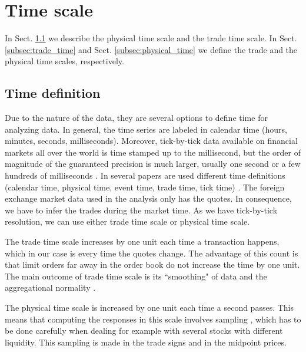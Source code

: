 \section{Time scale}\label{sec:time_scale}

In Sect. \ref{subsec:time_definition} we describe the physical time scale and
the trade time scale. In Sect. \ref{subsec:trade_time} and Sect.
\ref{subsec:physical_time} we define the trade and the physical time scales,
respectively.

\subsection{Time definition}\label{subsec:time_definition}

Due to the nature of the data, they are several options to define time for
analyzing data. In general, the time series are labeled in calendar time
(hours, minutes, seconds, milliseconds). Moreover, tick-by-tick data available
on financial markets all over the world is time stamped up to the millisecond,
but the order of magnitude of the guaranteed precision is much larger, usually
one second or a few hundreds of milliseconds
\cite{market_digest,empirical_facts}. In several papers are used different time
definitions (calendar time, physical time, event time, trade time, tick time)
\cite{empirical_facts,sampling_returns,market_making}. The foreign exchange
market data used in the analysis only has the quotes. In consequence, we have
to infer the trades during the market time. As we have tick-by-tick resolution,
we can use either trade time scale or physical time scale.

The trade time scale increases by one unit each time a transaction happens,
which in our case is every time the quotes change. The advantage of this count
is that limit orders far away in the order book do not increase the time by one
unit. The main outcome of trade time scale is its ``smoothing" of data and the
aggregational normality \cite{empirical_facts}.

The physical time scale is increased by one unit each time a second passes.
This means that computing the responses in this scale involves sampling
\cite{Wang_2016_cross,sampling_returns}, which has to be done carefully when
dealing for example with several stocks with different liquidity. This sampling
is made in the trade signs and in the midpoint prices.

